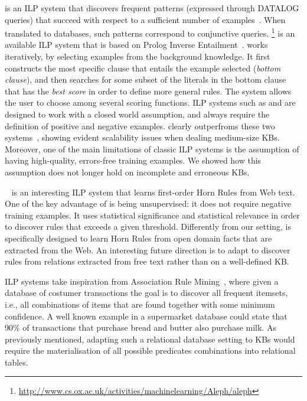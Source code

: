  is an ILP system that discovers frequent patterns (expressed through DATALOG queries) that succeed with respect to a sufficient number of examples~\cite{dehaspe1999discovery}. When translated to databases, such patterns correspond to conjunctive queries. \footnote{\url{http://www.cs.ox.ac.uk/activities/machinelearning/Aleph/aleph}} is an available ILP system that is based on Prolog Inverse Entailment~\cite{muggleton1995inverse}.  works iteratively, by selecting examples from the background knowledge. It first constructs the most specific clause that entails the example selected (\emph{bottom clause}), and then searches for some subset of the literals in the bottom clause that has the \emph{best score} in order to define more general rules. The system allows the user to choose among several scoring functions. ILP systems such as  and  are designed to work with a closed world assumption, and always require the definition of positive and negative examples. \amie clearly outperfroms these two systems~\cite{galarraga2015fast}, showing evident scalability issues when dealing medium-size KBs. Moreover, one of the main limitations of classic ILP systems is the assumption of having high-quality, errors-free training examples. We showed how this assumption does not longer hold on incomplete and erroneous KBs.

~\cite{schoenmackers2010learning} is an interesting ILP system that learns first-order Horn Rules from Web text. One of the key advantage of  is being unsupervised: it does not require negative training examples. It uses statistical significance and statistical relevance in order to discover rules that exceeds a given threshold. Differently from our setting,  is specifically designed to learn Horn Rules from open domain facts that are extracted from the Web. An interesting future direction is to adapt \krd to discover rules from relations extracted from free text rather than on a well-defined KB.

ILP systems take inspiration from Association Rule Mining~\cite{agrawal1993mining}, where given a database of costumer transactions the goal is to discover all frequent itemsets, i.e., all combinations of
items that are found together with some minimum confidence. A well known example in a supermarket database could state that 90\% of transactions that purchase
bread and butter also purchase milk. As previously mentioned, adapting such a relational database setting to KBs would require the materialisation of all possible predicates combinations into relational tables.

